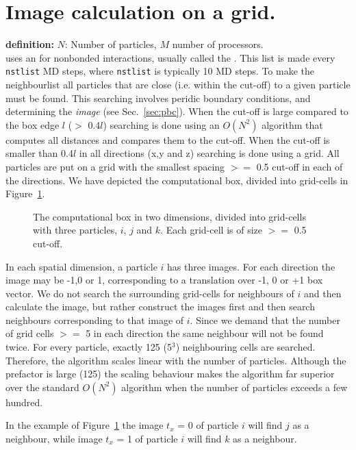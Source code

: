 \newcommand{\nproc}{\mbox{$M$}}
\newcommand{\natom}{\mbox{$N$}}

\section{Image calculation on a grid.}
\label{sec:nsgrid}
{\bf definition:} {\natom}: Number of particles, {\nproc} number of processors.\\
{\gromacs} uses an  for nonbonded interactions,
usually called the {\em {}}.
This list is made every {\tt nstlist} MD steps, where {\tt nstlist} is
typically 10 MD steps. 
To make the neighbourlist all particles that are close 
(i.e. within the cut-off) to a given particle must be found.
This searching involves peridic boundary conditions, and 
determining the {\em image} (see Sec.~\ref{sec:pbc}).
When the cut-off is large compared to the box edge $l$ ($>$ 0.4$l$)
searching is done using an $O({\natom}^2)$ algorithm that computes
all distances and compares them to the cut-off.
When the cut-off is smaller than 0.4$l$ in all directions (x,y and z)
searching is done using a grid. All particles are put on a grid
with the smallest spacing  $>=$ 0.5 cut-off in each of the directions.
We have depicted the computational box, divided into grid-cells in 
Figure~\ref{fig:nsgrid}.
\begin{figure}
\centerline{}
\caption{The computational box in two dimensions, divided into grid-cells with three particles, $i$, $j$ and $k$. Each grid-cell is of size $>=$ 0.5 cut-off.}
\label{fig:nsgrid}
\end{figure}
In each spatial dimension, a particle $i$ has three images. For each direction
the image may be -1,0 or 1, corresponding to a translation over -1, 0 or +1
box vector. We do not search the surrounding grid-cells for
neighbours of $i$ and then calculate the image, 
but rather construct the images first and then 
search neighbours corresponding to that image of $i$.
Since we demand that the number of grid cells $>=$ 5 in each direction 
the same neighbour will not be found twice. For every particle, exactly 125 (5$^3$)
neighbouring cells are searched. Therefore, the algorithm scales linear with the 
number of particles. Although the prefactor is large (125) the scaling behaviour
makes the algorithm far superior over the standard $O({\natom}^2)$ 
algorithm when the 
number of particles exceeds a few hundred.

In the example of Figure~\ref{fig:nsgrid} the image $t_x$ = 0 of particle
$i$ will find $j$ as a neighbour, while image $t_x$ = 1 of particle $i$
will find $k$ as a neighbour.


